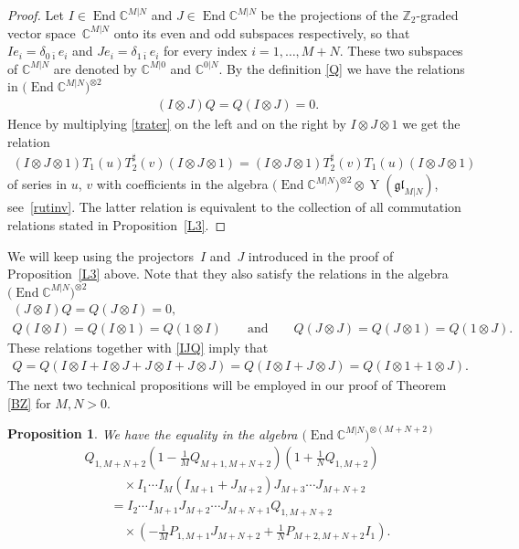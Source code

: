 \documentclass[10pt,a4paper]{amsart}
\numberwithin{equation}{section}
\newtheorem{Proposition}[Theorem]{Proposition}
\def\bi{{\bar\imath }}
\def\CC{{\mathbb{C}}}
\def\CMN{\CC^{M|N}}
\def\de{\delta}
\def\End{\operatorname{End}}
\def\glMN{\mathfrak{gl}_{M|N}}
\def\ot{\otimes}
\def\TS{T^{\sharp}}
\def\YMN{\operatorname{Y}(\glMN)}
\def\ZZ{\mathbb{Z}}
\begin{document}
\begin{proof}Let $I\in\End\CMN$ and $J\in\End\CMN$
be the projections of the $\ZZ_2$-graded vector space~$\CMN$ onto
its even and odd subspaces respectively, so that
$I e_i=\de_{0 \bi} e_i$ and
$J e_i=\de_{1 \bi} e_i$
for every index $i=1,\dots, M+N $.
These two subspaces of $\CMN$ are denoted by
$\CC^{M| 0}$ and $\CC^{0 |N}$.
By the definition \eqref{Q} we have the relations in %
$\big(\End\CMN\big)^{\ot2}$
\begin{gather}
\label{IJQ}
(I\ot J) Q=
Q (I\ot J)=0 .
\end{gather}
Hence by multiplying \eqref{trater}
on the left and on the right by $I\ot J\ot1$ we get
the relation
\begin{gather}\label{referee2}
(I\ot J\ot1) T_1(u) \TS_2(v) (I\ot J\ot1)=
(I\ot J\ot1) \TS_2(v) T_1(u) (I\ot J\ot1)
\end{gather}
of series in $u$, $v$ with coefficients
in the algebra $\big(\End\CMN\big)^{\ot2}\ot\YMN $,
see~\eqref{rutinv}. The latter relation is equivalent to the collection of all
commutation relations stated in Proposition~\ref{L3}.
\end{proof}

We will keep using the projectors~$I$ and~$J$ introduced in
the proof of Proposition~\ref{L3} above.
Note that they also satisfy the relations in the algebra $\big(\End\CMN\big)^{\ot2}$
\begin{gather*}
(J\ot I) Q=Q (J\ot I)=0 ,\\
Q (I\ot I)=Q (I\ot 1)=Q (1\ot I) \qquad\text{and}\qquad Q (J\ot J)=Q (J\ot 1)=Q (1\ot J) .
\end{gather*}
These relations together with \eqref{IJQ} imply that
\begin{gather}
Q=Q (I\ot I+I\ot J+J\ot I+J\ot J)=Q (I\ot I+J\ot J) =Q (I\ot 1+1\ot J) .\label{IJ}
\end{gather}
The next two technical propositions
will be employed in our proof of Theorem \ref{BZ} for $M,N>0 $.

\begin{Proposition}\label{L2}
We have the equality in the algebra $\big(\End\CMN\big)^{\ot (M+N+2)}$
\begin{gather*}
 Q_{1,M+N+2}
\left( 1-\frac1M Q_{M+1,M+N+2} \right)
\left( 1+\frac1N Q_{1,M+2} \right)\\
\qquad\quad{} \times
I_{1} \cdots I_{M} ( I_{M+1}+J_{M+2} )
J_{M+3} \cdots J_{M+N+2} \\
\qquad {} = I_{2} \cdots I_{M+1}
J_{M+2} \cdots J_{M+N+1} Q_{1,M+N+2}\\
\qquad\quad{}\times
\left(- \frac1M P_{1,M+1} J_{M+N+2}+
\frac1N P_{M+2,M+N+2} I_{1} \right) .
\end{gather*}
\end{Proposition}
\end{document}
